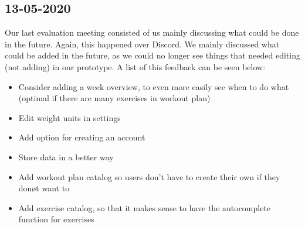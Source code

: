\documentclass{article}
\begin{document}
\subsection*{13-05-2020}
Our last evaluation meeting consisted of us mainly discussing what could be done in the future. Again, this happened over Discord. We mainly discussed what could be added in the future, as we could no longer see things that needed editing (not adding) in our prototype. A list of this feedback can be seen below:
\begin{itemize}
\item Consider adding a week overview, to even more easily see when to do what (optimal if there are many exercises in workout plan)
\item Edit weight units in settings
\item Add option for creating an account
\item Store data in a better way
\item Add workout plan catalog so users don't have to create their own if they donøt want to
\item Add exercise catalog, so that it makes sense to have the autocomplete function for exercises
\end{itemize}
\end{document}
